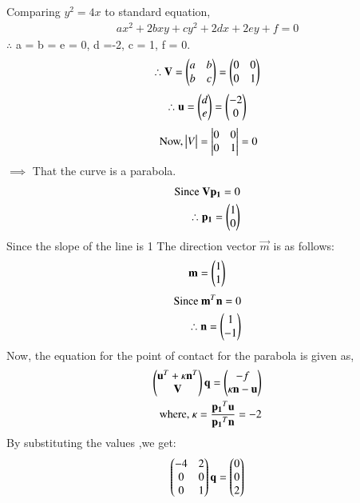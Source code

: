 Comparing $y^2=4x$ to standard equation,
\begin{align}
ax^2+2bxy+cy^2+2dx+2ey+f = 0
\end{align}
$\therefore$ a = b = e = 0, d =-2, c = 1, f = 0.
\begin{align}
\therefore \mathbf{V} = \begin{pmatrix}a&b\\b&c\end{pmatrix} = \begin{pmatrix}0&0\\0&1\end{pmatrix}
\end{align} 
\begin{align}
\therefore\mathbf{u} = \begin{pmatrix}d\\e\end{pmatrix} = \begin{pmatrix}-2\\0\end{pmatrix}\label{eq:solutions/1/20/u}
\end{align}
\begin{align}
 \mbox{ Now,} \begin{vmatrix}V\end{vmatrix} = \begin{vmatrix}0&0\\0&1\end{vmatrix} = 0
\end{align}
$\implies$ That the curve is a parabola.
\begin{align}
    \mbox{Since} \ \mathbf{V}\mathbf{p_1}=0\\
    \therefore \mathbf{p_1}=\begin{pmatrix}1\\0\end{pmatrix}
\end{align}
Since the slope of the line is 1
The direction vector $\vec{m}$ is as follows:
\begin{align}
\mathbf{m} = \begin{pmatrix}1\\1\end{pmatrix}
\end{align}
\begin{align}
    \mbox{Since} \ \mathbf{m}^T\mathbf{n}=0 \\
    \therefore \mathbf{n} = \begin{pmatrix}1\\-1\end{pmatrix}\label{eq:solutions/1/20/n}
\end{align} 
Now, the equation for the point of contact for the parabola is given as,
\begin{align}
\begin{pmatrix}\mathbf{u}^T+\kappa\mathbf{n}^T\\\mathbf{V}\end{pmatrix}\mathbf{q} = \begin{pmatrix}-f\\\kappa\mathbf{n}-\mathbf{u}\end{pmatrix}\label{eq:solutions/1/20/contact}\\
\mbox{where, } \kappa = \frac{\mathbf{p_1}^T\mathbf{u}}{\mathbf{p_1}^T\mathbf{n}} = -2 \label{eq:solutions/1/20/k}
\end{align}
By substituting the values ,we get:
\begin{align}
\begin{pmatrix}-4&2\\0&0\\0&1\end{pmatrix}\mathbf{q} = \begin{pmatrix}0\\0\\2\end{pmatrix}
\label{eq:solutions/1/20/solve_q}
\end{align}
